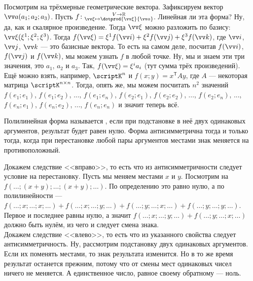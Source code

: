 \documentclass{article}
\let\vec\vv
\newcommand*{\trans}{^{\mathsf T}}
\begin{document}
\begin{itemize}
        \begin{Example}
            Посмотрим на трёхмерные геометрические вектора. Зафиксируем вектор $\vec a(a_1;a_2;a_3)$. Пусть $f\colon\substack{V\to\mathbb R\\\vec\xi\mapsto\dotprod{\vec\xi}{\vec a}}$. Линейная ли эта форма? Ну, да, как и скалярное произведение. Тогда $\vec\xi$ можно разложить по базису: $\vec\xi(\xi^1;\xi^2;\xi^3)$. Тогда $f(\vec\xi)=\xi^1f(\vec i)+\xi^2f(\vec j)+\xi^3f(\vec k)$, где $\vec i$, $\vec j$, $\vec k$ --- это базисные вектора. То есть на самом деле, посчитав $f(\vec i)$, $f(\vec j)$ и $f(\vec k)$, мы можем узнать $f$ в любой точке. Ну, мы и знаем эти три значения, это $a_1$, $a_2$ и $a_3$. Так, $f(\vec\xi)=\xi^ia_i$ (тут сумма трёх произведений).\\
            Ещё можно взять, например, $\scriptK^n$ и $f(x;y)=x\trans Ay$, где $A$ --- некоторая матрица $\scriptK^{n\times n}$. Тогда, опять же, мы можем посчитать $n^2$ значений $f(e_1;e_1)$, $f(e_1;e_2)$, ..., $f(e_1;e_n)$, $f(e_2;e_1)$, $f(e_2;e_2)$, ..., $f(e_2;e_n)$, ..., $f(e_n;e_1)$, $f(e_n;e_2)$, ..., $f(e_n;e_n)$ и значит теперь всё.
        \end{Example}
        \dfn Полилинейная форма называется , если при подстановке в неё двух одинаковых аргументов, результат будет равен нулю.
        \thm Форма антисимметрична тогда и только тогда, когда при перестановке любой пары аргументов местами знак меняется на противоположный.
        \begin{Proof}
            Докажем следствие <<вправо>>, то есть что из антисимметричности следует условие на перестановку. Пусть мы меняем местами $x$ и $y$. Посмотрим на $f(\ldots;(x+y);\ldots;(x+y);\ldots)$. По определению это равно нулю, а по полилинейности --- $f(\ldots;x;\ldots;x;\ldots)+f(\ldots;x;\ldots;y;\ldots)+f(\ldots;y;\ldots;x;\ldots)+f(\ldots;y;\ldots;y;\ldots)$. Первое и последнее равны нулю, а значит $f(\ldots;x;\ldots;y;\ldots)+f(\ldots;y;\ldots;x;\ldots)$ должно быть нулём, из чего и следует смена знака.\\
            Докажем следствие <<влево>>, то есть что из указанного свойства следует антисимметричность. Ну, рассмотрим подстановку двух одинаковых аргументов. Если их поменять местами, то знак результата изменится. Но в то же время результат останется прежним, потому что от смены мест одинаковых чисел ничего не меняется. А единственное число, равное своему обратному --- ноль.
        \end{Proof}
        \begin{Comment}

\end{Comment}
\end{itemize}
\end{document}
